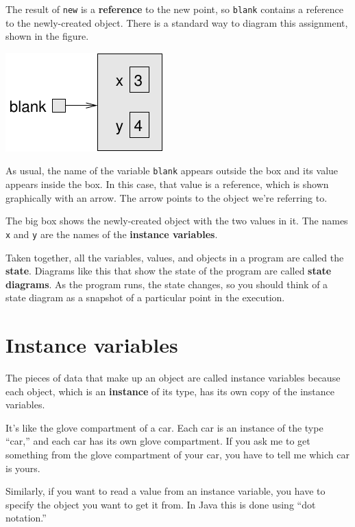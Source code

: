 
The result of {\tt new} is a {\bf reference} to the new
point, so {\tt blank} contains a reference to the
newly-created object.  There is a standard way to diagram this
assignment, shown in the figure.


\includegraphics{figs/reference.pdf}


As usual, the name of the variable {\tt blank} appears outside the box
and its value appears inside the box.  In this case, that value is a
reference, which is shown graphically with an arrow.  The
arrow points to the object we're referring to.

The big box shows the newly-created object with the two values
in it.  The names {\tt x} and {\tt y} are the names of the {\bf
instance variables}.

Taken together, all the variables, values, and objects in a
program are called the {\bf state}.  Diagrams like this that
show the state of the program are called {\bf state diagrams}.
As the program runs, the state changes, so you should think
of a state diagram as a snapshot of a particular point in the
execution.


\section{Instance variables}

The pieces of data that make up an object are called instance
variables because each object, which is an {\bf instance} of its
type, has its own copy of the instance variables.

It's like the glove compartment of a car.  Each car is an instance
of the type ``car,'' and each car has its own glove compartment.  If
you ask me to get something from the glove compartment of your car,
you have to tell me which car is yours.


Similarly, if you want to read a value from an instance variable, you
have to specify the object you want to get it from.  In Java this is
done using ``dot notation.''

